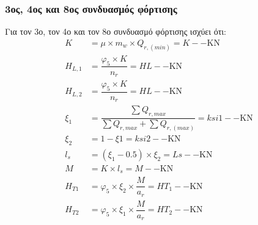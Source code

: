 \subsubsection{3ος, 4ος και 8ος συνδυασμός φόρτισης}
Για τον 3ο, τον 4ο και τον 8ο συνδυασμό φόρτισης ισχύει ότι:
\begin{align*}
K         &= μ \times m_w \times Q_{r,(min)}  = K-- \text{KN} \\ 
H_{L,1}   &= \dfrac{φ_5 \times K} {n_r} = HL-- \text{KN} \\ 
H_{L,2}   &= \dfrac{φ_5 \times K} {n_r} = HL-- \text{KN} \\ 
ξ_1       &= \dfrac{\displaystyle\sum{Q_{r,max}}}{\displaystyle\sum{Q_{r,max} + \displaystyle\sum{Q_{r,(max)}}}} = ksi1-- \text{KN} \\ 
ξ_2       &= 1 - ξ1 = ksi2-- \text{KN} \\ 
l_s       &= (ξ_1 - 0.5) \times ξ_2 = Ls-- \text{KN} \\ 
M         &= K \times l_s = M-- \text{KN} \\ 
H_{T1}    &= φ_5 \times ξ_2 \times \dfrac{M}{a_r} = HT_1-- \text{KN} \\ 
H_{T2}    &= φ_5 \times ξ_1 \times \dfrac{M}{a_r} = HT_2-- \text{KN} 
\end{align*}



